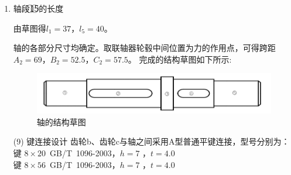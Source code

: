 \begin{enumerate}[i]
	\item 轴段\textcircled{1}\textcircled{5}的长度
	\par 由草图得$l_1=37$，$l_5=40$。
	\par 轴的各部分尺寸均确定。取联轴器轮毂中间位置为力的作用点，可得跨距$A_2=69$，$B_2=52.5$，$C_2=57.5$。 
	完成的结构草图如下所示:
	\begin{figure}[H]
		\begin{center}
			\caption{轴\uppercase\expandafter{}的结构草图}
			\includegraphics[width=\textwidth]{pic/zhou2.png}
		\end{center}
	\end{figure}
	(9)	键连接设计
	齿轮b、齿轮c与轴之间采用A型普通平键连接，型号分别为：\\
	键 $8\times 20$~GB/T~1096-2003，$h=7$ ，$t=4.0$ \\
	键  $8\times 56$~GB/T~1096-2003，$h=7$ ，$t=4.0$
\end{enumerate}
